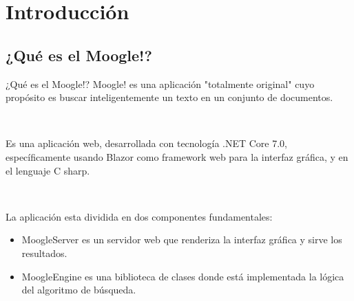 \section{Introducción}

\subsection{¿Qué es el Moogle!?}
\begin{frame}{¿Qué es el Moogle!?}
    Moogle! es una aplicación "totalmente original" cuyo propósito es
buscar inteligentemente un texto en un conjunto de documentos.

\

Es una aplicación web, desarrollada con tecnología .NET Core
7.0, específicamente usando Blazor como framework web para la
interfaz gráfica, y en el lenguaje C sharp.

\

La aplicación esta dividida en dos componentes fundamentales:
\pause
\begin{itemize}
    \item MoogleServer es un servidor web que renderiza la interfaz
    gráfica y sirve los resultados.

\pause 
    
    \item MoogleEngine es una biblioteca de clases donde está
    implementada la lógica del algoritmo de búsqueda.
\end{itemize}    
\end{frame} 
